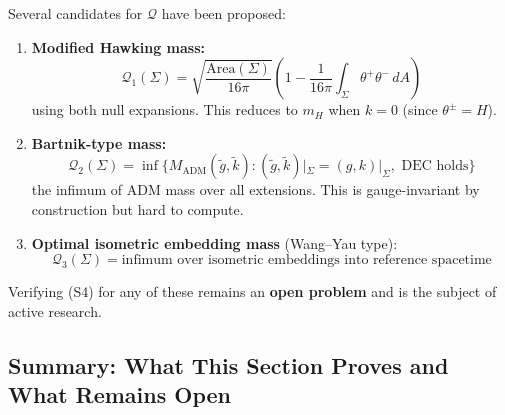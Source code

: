 \begin{remark}
Several candidates for $\mathcal{Q}$ have been proposed:
\begin{enumerate}[label=(\alph*)]
\item \textbf{Modified Hawking mass:}
\[
\mathcal{Q}_1(\Sigma) = \sqrt{\frac{\mathrm{Area}(\Sigma)}{16\pi}}\left(1 - \frac{1}{16\pi}\int_\Sigma \theta^+\theta^- \, dA\right)
\]
using both null expansions. This reduces to $m_H$ when $k=0$ (since $\theta^\pm = H$).

\item \textbf{Bartnik-type mass:}
\[
\mathcal{Q}_2(\Sigma) = \inf\{M_{\mathrm{ADM}}(\tilde{g}, \tilde{k}) : (\tilde{g},\tilde{k})|_\Sigma = (g,k)|_\Sigma, \text{ DEC holds}\}
\]
the infimum of ADM mass over all extensions. This is gauge-invariant by construction but hard to compute.

\item \textbf{Optimal isometric embedding mass} (Wang--Yau type):
\[
\mathcal{Q}_3(\Sigma) = \text{infimum over isometric embeddings into reference spacetime}
\]
\end{enumerate}

Verifying (S4) for any of these remains an \textbf{open problem} and is the subject of active research.
\end{remark}

\subsection{Summary: What This Section Proves and What Remains Open}

